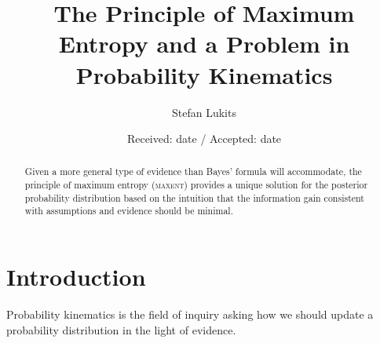 \documentclass[smallextended]{svjour3}       %
\begin{document}
\title{The Principle of Maximum Entropy and a Problem in Probability Kinematics}

\author{Stefan Lukits}


\date{Received: date / Accepted: date}

\maketitle

\begin{abstract}
  \noindent Given a more general type of evidence than Bayes' formula
  will accommodate, the principle of maximum entropy (\textsc{maxent})
  provides a unique solution for the posterior probability
  distribution based on the intuition that the information gain
  consistent with assumptions and evidence should be minimal.
\end{abstract}

\section{Introduction}
\label{Introduction}

Probability kinematics is the field of inquiry asking how we should
update a probability distribution in the light of evidence. 
%  


\end{document}

